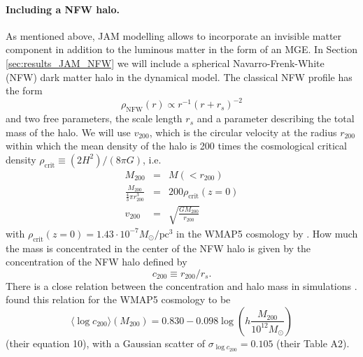 \paragraph{Including a NFW halo.} As mentioned above, JAM modelling allows to incorporate an invisible matter component in addition to the luminous matter in the form of an MGE. In Section \ref{sec:results_JAM_NFW} we will include a spherical Navarro-Frenk-White (NFW) dark matter halo \citep{NFW96} in the dynamical model. The classical NFW profile has the form
\begin{equation}
\rho_\text{NFW}(r) \propto r^{-1} \left( r+r_s \right)^{-2} \label{eq:NFWprofile}
\end{equation}
and two free parameters, the scale length $r_s$ and a parameter describing the total mass of the halo. We will use $v_\text{200}$, which is the circular velocity at the radius $r_\text{200}$ within which the mean density of the halo is 200 times the cosmological critical density $\rho_\text{crit} \equiv (2H^2)/(8\pi G)$, i.e.
\begin{eqnarray*}
M_\text{200} &=& M(<r_{200})\\
\frac{M_{200}}{ \frac 43 \pi r_{200}^3} &=& 200 \rho_\text{crit}(z=0) \\
v_\text{200} &=& \sqrt{\frac{GM_{200}}{r_\text{200}}}
\end{eqnarray*}
with $\rho_\text{crit}(z=0)=1.43 \cdot 10^{-7} M_\odot / \text{pc}^3$ in the WMAP5 cosmology by \citet{WMAP5cosm}. How much the mass is concentrated in the center of the NFW halo is given by the concentration of the NFW halo defined by 
\begin{equation}
c_{200}\equiv r_{200} / r_s. \label{eq:NFW_c}
\end{equation} 
There is a close relation between the concentration and halo mass in simulations \citep{NFW96}. \citet{Maccio08} found this relation for the WMAP5 cosmology to be
\begin{equation}
\langle \log c_{200} \rangle (M_{200}) = 0.830 - 0.098 \log \left(h \frac{M_{200}}{10^{12} M_\odot} \right) \label{eq:Maccio08}
\end{equation}
(their equation 10), with a Gaussian scatter of $\sigma_{\log c_{200}} = 0.105$ (their Table A2). 